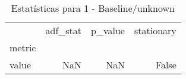 \begin{table}[htbp]
\caption{Estatísticas para 1 - Baseline/unknown}
\label{tab:1_-_baseline_unknown_adf_test}
\begin{tabular}{lrrr}
\toprule
 & adf_stat & p_value & stationary \\
metric &  &  &  \\
\midrule
value & NaN & NaN & False \\
\bottomrule
\end{tabular}
\end{table}
